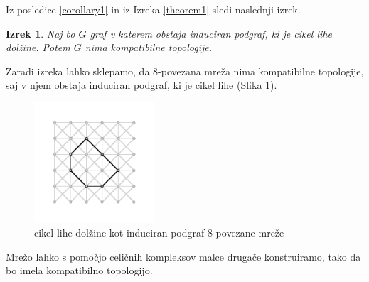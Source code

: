 \documentclass[a4paper, 12pt]{book}
\newtheorem{theorem}{Izrek}[section]
\theoremstyle{definition}
\theoremstyle{remark}
\begin{document}
Iz posledice \ref*{corollary1} in iz Izreka \ref*{theorem1} sledi naslednji izrek.
\newpage
\begin{theorem}
Naj bo $G$ graf v katerem obstaja induciran podgraf, ki je cikel lihe dolžine. Potem
$G$ nima kompatibilne topologije.
\end{theorem}
Zaradi izreka lahko sklepamo, da 8-povezana mreža nima kompatibilne topologije,
saj v njem obstaja induciran podgraf, ki je cikel lihe (Slika \ref{oddCircle}).
\begin{figure}
  \begin{center}
  \includegraphics[width=0.4\textwidth]{odd_circle.pdf}
  \end{center}
  \caption{cikel lihe dolžine kot induciran podgraf 8-povezane mreže}
  \label{oddCircle}
\end{figure}
Mrežo lahko s pomočjo celičnih kompleksov malce drugače konstruiramo, tako
da bo imela kompatibilno topologijo.
\newpage
\end{document}
